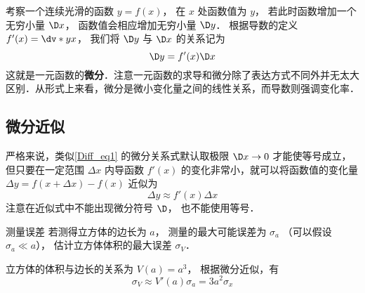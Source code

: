 

考察一个连续光滑的函数 $y = f(x)$， 在 ${x}$ 处函数值为 ${y}$， 若此时函数增加一个无穷小量 $\D x$， 函数值会相应增加无穷小量 $\D y$． 根据导数的定义 $f'({{x}}) = \dv*{y}{x}$， 我们将 $\D y$ 与 $\D x$ 的关系记为
\begin{equation}\label{Diff_eq1}
\D y = f'(x)\D x
\end{equation}
这就是一元函数的\textbf{微分}．注意一元函数的求导和微分除了表达方式不同外并无太大区别．从形式上来看，微分是微小变化量之间的线性关系，而导数则强调变化率．

\subsection{微分近似}
严格来说，类似\autoref{Diff_eq1} 的微分关系式默认取极限 $\D x \to 0$ 才能使等号成立，但只要在一定范围 $\Delta x$ 内导函数 $f'(x)$ 的变化非常小，就可以将函数值的变化量 $\Delta y = f(x+\Delta x)-f(x)$ 近似为
\begin{equation}
\Delta y \approx f'(x) \Delta x
\end{equation}
注意在近似式中不能出现微分符号 $\D$， 也不能使用等号．

\begin{exam}{测量误差}\label{Diff_ex1}
若测得立方体的边长为 $a$， 测量的最大可能误差为 $\sigma_a$ （可以假设 $\sigma_a \ll a$）， 估计立方体体积的最大误差 $\sigma_V$．

立方体的体积与边长的关系为 $V(a)=a^3$， 根据微分近似，有
\begin{equation}
\sigma_V \approx V'(a) \sigma_a = 3a^2 \sigma_x
\end{equation}
\end{exam}




